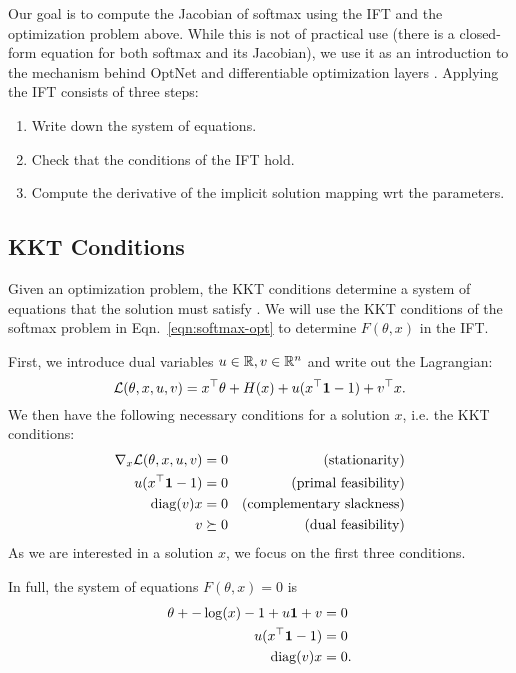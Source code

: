 \documentclass[11pt]{article}
\begin{document}
Our goal is to compute the Jacobian of softmax
using the IFT and the optimization problem above.
While this is not of practical use (there is a closed-form equation
for both softmax and its Jacobian),
we use it as an introduction to the mechanism
behind OptNet and differentiable optimization layers
\citep{optnet,agrawal2019diffcvx}.
Applying the IFT consists of three steps:
\begin{enumerate}
\item Write down the system of equations.
\item Check that the conditions of the IFT hold.
\item Compute the derivative of the implicit solution mapping wrt the parameters.
\end{enumerate}

\subsection{KKT Conditions}
Given an optimization problem, the KKT conditions determine a system of equations
that the solution must satisfy \citep{kkt-thesis,kkt}.
We will use the KKT conditions of the softmax problem in
Eqn.~\ref{eqn:softmax-opt} to determine $F(\theta,x)$ in the IFT.

First, we introduce dual variables $u\in\mathbb{R},v\in\mathbb{R}^n$ and write out the Lagrangian:
$$\mathcal{L}(\theta, x, u, v) = x^\top\theta + H(x) + u(x^\top \mathbf{1} - 1) + v^\top x.$$
We then have the following necessary conditions for a solution $x$,
i.e. the KKT conditions:
\begin{equation}
\begin{aligned}
\nabla_x \mathcal{L}(\theta, x,u,v) = 0 && \textrm{(stationarity)}\\
u(x^{\top} \mathbf{1} - 1) = 0 && \textrm{(primal feasibility)}\\
\mathrm{diag}(v)x = 0 && \textrm{(complementary slackness)}\\
v \succeq 0 && \textrm{(dual feasibility)}
\end{aligned}
\end{equation}
As we are interested in a solution $x$, we focus on the first three conditions.

In full, the system of equations $F(\theta, x) = 0$ is
\begin{equation}
\label{eqn:system}
\begin{aligned}
\theta + -\log(x) - 1 + u\mathbf{1} + v &= 0\\
u(x^{\top} \mathbf{1} - 1) &= 0\\
\mathrm{diag}(v)x &= 0.
\end{aligned}
\end{equation}
\end{document}
